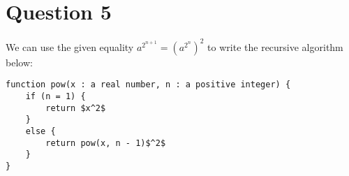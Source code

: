 \documentclass[11pt]{article}
\begin{document}
\section*{Question 5}
We can use the given equality $a^{2^{n+1}} = (a^{2^{n}})^2$ to write the recursive algorithm below:

\begin{lstlisting}[mathescape=true]
function pow(x : a real number, n : a positive integer) {
    if (n = 1) {
        return $x^2$
    }
    else {
        return pow(x, n - 1)$^2$
    }
}
\end{lstlisting}
\end{document}
